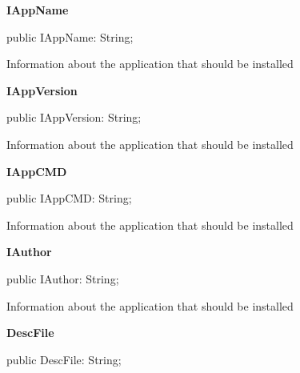 \documentclass{report}
\newif\ifpdf
\begin{document}
\begin{list}{}
\begin{flushleft}
\ifpdf
\end{flushleft}
\fi


\par  \label{mainunit.TIWizFrm-IAppName}
\item[\textbf{IAppName}\hfill]
\ifpdf
\begin{flushleft}
\fi
\begin{ttfamily}
public IAppName: String;\end{ttfamily}

\ifpdf
\end{flushleft}
\fi


\par Information about the application that should be installed\label{mainunit.TIWizFrm-IAppVersion}
\item[\textbf{IAppVersion}\hfill]
\ifpdf
\begin{flushleft}
\fi
\begin{ttfamily}
public IAppVersion: String;\end{ttfamily}

\ifpdf
\end{flushleft}
\fi


\par Information about the application that should be installed\label{mainunit.TIWizFrm-IAppCMD}
\item[\textbf{IAppCMD}\hfill]
\ifpdf
\begin{flushleft}
\fi
\begin{ttfamily}
public IAppCMD: String;\end{ttfamily}

\ifpdf
\end{flushleft}
\fi


\par Information about the application that should be installed\label{mainunit.TIWizFrm-IAuthor}
\item[\textbf{IAuthor}\hfill]
\ifpdf
\begin{flushleft}
\fi
\begin{ttfamily}
public IAuthor: String;\end{ttfamily}

\ifpdf
\end{flushleft}
\fi


\par Information about the application that should be installed\label{mainunit.TIWizFrm-DescFile}
\item[\textbf{DescFile}\hfill]
\ifpdf
\begin{flushleft}
\fi
\begin{ttfamily}
public DescFile: String;\end{ttfamily}


\end{flushleft}
\end{list}
\end{document}
